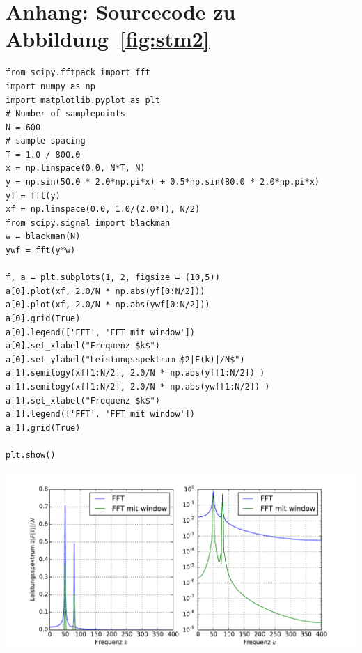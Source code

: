 \section{Anhang: Sourcecode zu Abbildung~\ref{fig:stm2}}
\begin{verbatim}
from scipy.fftpack import fft
import numpy as np
import matplotlib.pyplot as plt
# Number of samplepoints
N = 600
# sample spacing
T = 1.0 / 800.0
x = np.linspace(0.0, N*T, N)
y = np.sin(50.0 * 2.0*np.pi*x) + 0.5*np.sin(80.0 * 2.0*np.pi*x)
yf = fft(y)
xf = np.linspace(0.0, 1.0/(2.0*T), N/2)
from scipy.signal import blackman
w = blackman(N)
ywf = fft(y*w)

f, a = plt.subplots(1, 2, figsize = (10,5))
a[0].plot(xf, 2.0/N * np.abs(yf[0:N/2]))
a[0].plot(xf, 2.0/N * np.abs(ywf[0:N/2]))
a[0].grid(True)
a[0].legend(['FFT', 'FFT mit window'])
a[0].set_xlabel("Frequenz $k$")
a[0].set_ylabel("Leistungsspektrum $2|F(k)|/N$")
a[1].semilogy(xf[1:N/2], 2.0/N * np.abs(yf[1:N/2]) )
a[1].semilogy(xf[1:N/2], 2.0/N * np.abs(ywf[1:N/2]) )
a[1].set_xlabel("Frequenz $k$")
a[1].legend(['FFT', 'FFT mit window'])
a[1].grid(True)

plt.show()
\end{verbatim}
\includegraphics[width=17cm]{pics/stm2}

